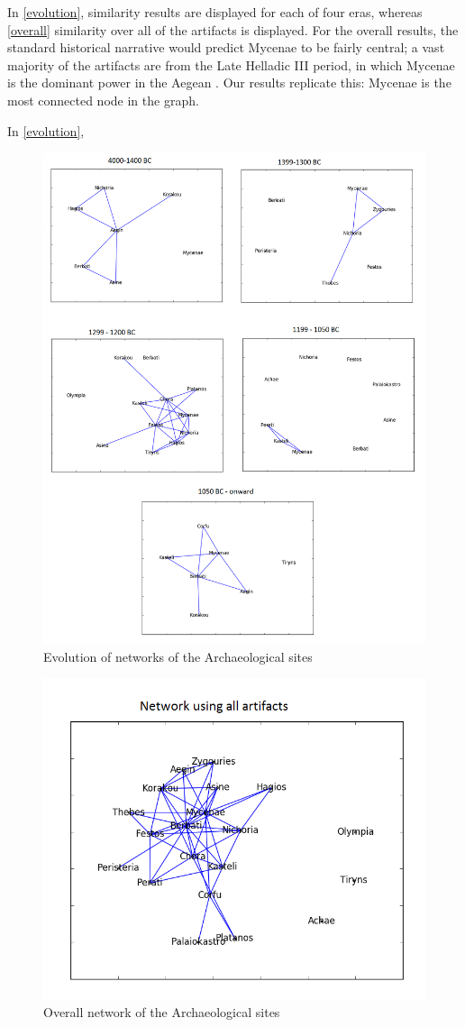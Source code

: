   
In \cref{evolution}, similarity results are displayed for each of four eras, whereas \cref{overall} similarity over all of the artifacts is displayed. For the overall results, the standard historical narrative would predict Mycenae to be fairly central; a vast majority of the artifacts are from the Late Helladic III period, in which Mycenae is the dominant power in the Aegean \cite{demand2011mediterranean}. Our results replicate this: Mycenae is the most connected node in the graph. 

In \cref{evolution}, 

\begin{figure}
\includegraphics[width=\textwidth]{Network_evolution.png}
\caption{Evolution of networks of the Archaeological sites}
\label{fig:evolution}
\end{figure}


\begin{figure}
\includegraphics[width=\textwidth]{Overall_Network.png}
\caption{Overall network of the Archaeological sites}
\label{fig:overall}
\end{figure}
